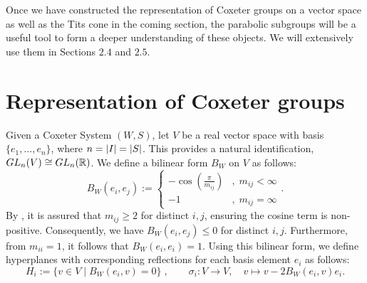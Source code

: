 Once we have constructed the representation of Coxeter groups on a vector space as well as the Tits cone in the coming section, the parabolic subgroups will be a useful tool to form a deeper understanding of these objects.
We will extensively use them in Sections \(2.4\) and \(2.5\).

\section{Representation of Coxeter groups}

Given a Coxeter System \((W,S)\), let \(V\) be a real vector space with basis \(\{e_1,\ldots,e_n\}\), where \(n=\left\vert I\right\vert=\left\vert S\right\vert\).
This provides a natural identification, \(GL_n(V)\cong GL_n(\mathbb{R})\).
We define a bilinear form \(B_W\) on \(V\) as follows:
\begin{equation*}
    B_W(e_i, e_j) := \begin{cases}
        -\cos \left(\frac{\pi}{m_{ij}}\right) & ,\; m_{ij}<\infty \\
        -1                                    & ,\; m_{ij}=\infty
    \end{cases}.
\end{equation*}
By , it is assured that \(m_{ij}\geq 2\) for distinct \(i,j\), ensuring the cosine term is non-positive.
Consequently, we have \(B_W(e_i,e_j)\leq 0\) for distinct \(i,j\).
Furthermore, from \(m_{ii}=1\), it follows that \(B_W(e_i,e_i)=1\).
Using this bilinear form, we define hyperplanes with corresponding reflections for each basis element \(e_i\) as follows:
\[H_i := \{v\in V\;\vert\; B_W(e_i,v) = 0\}\;, \qquad \sigma_i : V\to V,\quad v\mapsto v - 2B_W(e_i,v)e_i.\]

